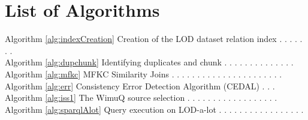 \tableofcontents
\newpage
\begingroup 
    \let\clearpage\relax
    \let\cleardoublepage\relax
    \let\cleardoublepage\relax

    
    \listoffigures
    \vspace*{8ex}

    \newpage
    \listoftables
    \vspace*{8ex}
    

\newpage
\chapter*{List of Algorithms}
Algorithm \ref{alg:indexCreation} Creation of the LOD dataset relation index . . . . . . . \pageref{alg:indexCreation}\\
Algorithm \ref{alg:dupchunk} Identifying duplicates and chunk . . . . . . . . . . . . . . \pageref{alg:dupchunk}\\
Algorithm \ref{alg:mfkc} MFKC Similarity Joins . . . . . . . . . . . . . . . . . . . . . . \pageref{alg:mfkc}\\
Algorithm \ref{alg:err} Consistency Error Detection Algorithm (CEDAL) . . . \pageref{alg:err}\\
Algorithm \ref{alg:iss1} The WimuQ source selection . . . . . . . . . . . . . . . . . . \pageref{alg:iss1}\\
Algorithm \ref{alg:sparqlAlot} Query execution on LOD-a-lot . . . . . . . . . . . . . . . . . \pageref{alg:sparqlAlot}

